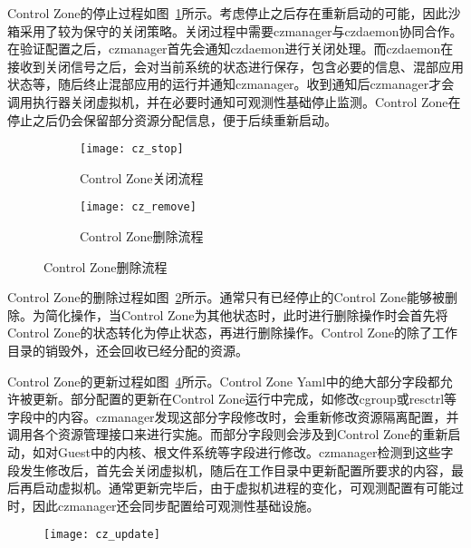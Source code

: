 Control Zone的停止过程如图~\ref{fig:cz_stop}所示。考虑停止之后存在重新启动的可能，因此沙箱采用了较为保守的关闭策略。关闭过程中需要czmanager与czdaemon协同合作。在验证配置之后，czmanager首先会通知czdaemon进行关闭处理。而czdaemon在接收到关闭信号之后，会对当前系统的状态进行保存，包含必要的信息、混部应用状态等，随后终止混部应用的运行并通知czmanager。收到通知后czmanager才会调用执行器关闭虚拟机，并在必要时通知可观测性基础停止监测。Control Zone在停止之后仍会保留部分资源分配信息，便于后续重新启动。

\begin{figure}[H]
    \centering
    \begin{subfigure}[b]{0.46\textwidth}
        \texttt{[image: cz\_stop]}
        \caption{\quad Control Zone关闭流程}
        \label{fig:cz_stop}
    \end{subfigure}
    \hfill
    \begin{subfigure}[b]{0.53\textwidth}
        \texttt{[image: cz\_remove]}
        \caption{\quad Control Zone删除流程}
        \label{fig:cz_remove}
    \end{subfigure}
\label{fig:cz_create_start}
\end{figure}

Control Zone的删除过程如图~\ref{fig:cz_remove}所示。通常只有已经停止的Control Zone能够被删除。为简化操作，当Control Zone为其他状态时，此时进行删除操作时会首先将Control Zone的状态转化为停止状态，再进行删除操作。Control Zone的除了工作目录的销毁外，还会回收已经分配的资源。

Control Zone的更新过程如图~\ref{fig:cz_update}所示。Control Zone Yaml中的绝大部分字段都允许被更新。部分配置的更新在Control Zone运行中完成，如修改cgroup或resctrl等字段中的内容。czmanager发现这部分字段修改时，会重新修改资源隔离配置，并调用各个资源管理接口来进行实施。而部分字段则会涉及到Control Zone的重新启动，如对Guest中的内核、根文件系统等字段进行修改。czmanager检测到这些字段发生修改后，首先会关闭虚拟机，随后在工作目录中更新配置所要求的内容，最后再启动虚拟机。通常更新完毕后，由于虚拟机进程的变化，可观测配置有可能过时，因此czmanager还会同步配置给可观测性基础设施。

\begin{figure}[H]
    \centering
    \texttt{[image: cz\_update]}
    \label{fig:cz_update}
\end{figure}

